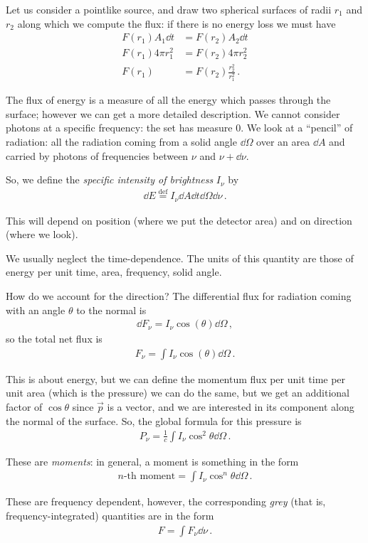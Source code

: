 \documentclass[main.tex]{subfiles}
\begin{document}
Let us consider a pointlike source, and draw two spherical surfaces of radii \(r_1 \) and \(r_2 \) along which we compute the flux: if there is no energy loss we must have 
%
\begin{align}
F(r_1 ) A_1 \dd{t} &= F(r_2 ) A_2 \dd{t}  \\
 F(r_1 ) 4 \pi r_1^2 &= F(r_2 ) 4 \pi r_2^2 \\
 F(r_1 ) &= F(r_2 ) \frac{r_2^2}{r_1^2}
\,.
\end{align}

The flux of energy is a measure of all the energy which passes through the surface; however we can get a more detailed description. 
We cannot consider photons at a specific frequency: the set has measure 0. 
We look at a ``pencil'' of radiation: all the radiation coming from a solid angle \(\dd{\Omega  }\) over an area \(\dd{A}\) and carried by photons of frequencies between \(\nu \) and \(\nu + \dd{\nu }\).

So, we define the \emph{specific intensity of brightness} \(I_{\nu }\) by
%
\begin{align}
\dd{E} \overset{\text{def}}{=} I_{\nu } \dd{A} \dd{t} \dd{\Omega } \dd{\nu }
\,.
\end{align}

This will depend on position (where we put the detector area) and on direction (where we look). 

We usually neglect the time-dependence. The units of this quantity are those of energy per unit time, area, frequency, solid angle. 

How do we account for the direction? 
The differential flux for radiation coming with an angle \(\theta \) to the normal is 
%
\begin{align}
\dd{F_{\nu } } = I_{\nu  } \cos(\theta ) \dd{\Omega }
\,,
\end{align}
%
so the total net flux is 
%
\begin{align}
F_{\nu } = \int I_{\nu } \cos(\theta ) \dd{\Omega }
\,.
\end{align}

This is about energy, but we can define the momentum flux per unit time per unit area (which is the pressure) we can do the same, but we get an additional factor of \(\cos \theta \) since \(\vec{p}\) is a vector, and we are interested in its component along the normal of the surface.
So, the global formula for this pressure is 
%
\begin{align}
P_{\nu } = \frac{1}{c} \int I_{\nu } \cos^2\theta \dd{\Omega } 
\,.
\end{align}

These are \emph{moments}: in general, a moment is something in the form 
%
\begin{align}
\text{\(n\)-th moment} = \int I_{\nu } \cos^{n} \theta \dd{\Omega }
\,.
\end{align}

These are frequency dependent, however, the corresponding \emph{grey} (that is, frequency-integrated) quantities are in the form 
%
\begin{align}
F = \int F_{\nu } \dd{\nu }
\,.
\end{align}
\end{document}
